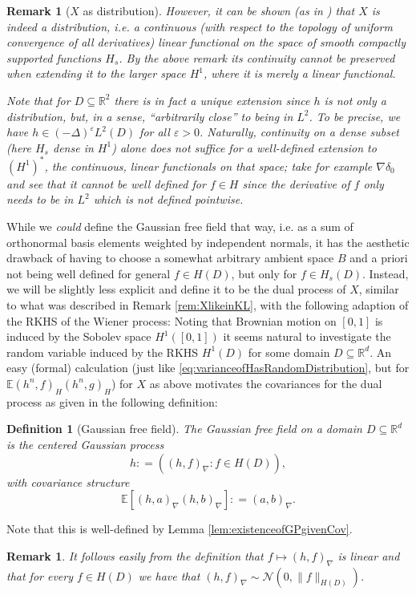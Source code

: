 \documentclass[11pt,reqno]{amsart}
\numberwithin{equation}{section}
\newtheorem{defi}[thm]{Definition}
\newtheorem{rem}[thm]{Remark}
\newcommand{\deq}{\mathrel{\mathop:}=}
\newcommand{\eps}{\varepsilon}
\begin{document}
\begin{rem}[$X$ as distribution]	\label{rem:spaceofX}
	However, it can be shown (as in \cite{She07}) that $X$ is indeed a distribution, i.e. a continuous (with respect to the topology of uniform convergence of all derivatives) linear functional on the space of smooth compactly supported functions $H_s$. By the above remark its continuity cannot be preserved when extending it to the larger space $H^1$, where it is merely a linear functional.
	
	Note that for $D\subseteq\mathbb R^2$ there is in fact a unique extension since $h$ is not only a distribution, but, in a sense, ``arbitrarily close'' to being in $L^2$. To be precise, we have $h\in (-\Delta)^\eps L^2(D)$ for all $\eps>0$. Naturally, continuity on a dense subset (here $H_s$ dense in $H^1$) alone does not suffice for a well-defined extension to $(H^1)^*$, the \emph{continuous}, linear functionals on that space; take for example $\nabla\delta_0$ and see that it cannot be well defined for $f\in H$ since the derivative of $f$ only needs to be in $L^2$ which is not defined pointwise.
\end{rem}

While we \emph{could} define the Gaussian free field that way, i.e. as a sum of orthonormal basis elements weighted by independent normals, it has the aesthetic drawback of having to choose a somewhat arbitrary ambient space $B$ and a priori not being well defined for general $f\in H(D)$, but only for $f\in H_s(D)$. Instead, we will be slightly less explicit and define it to be the dual process of $X$, similar to what was described in Remark \ref{rem:XlikeinKL}, with the following adaption of the RKHS of the Wiener process: Noting that Brownian motion on $[0,1]$ is induced by the Sobolev space $H^1([0,1])$ it seems natural to investigate the random variable induced by the RKHS $H^1(D)$ for some domain $D\subseteq\mathbb R^d$. An easy (formal) calculation (just like \eqref{eq:varianceofHasRandomDistribution}, but for $\mathbb E(h^n,f)_H(h^n,g)_H$) for $X$ as above motivates the covariances for the dual process as given in the following definition:

\begin{defi}[Gaussian free field]\label{def:GFF}
	The Gaussian free field on a domain $D\subseteq\mathbb R^d$ is the centered Gaussian process $$h\deq ((h,f)_\nabla : f\in H(D)),$$ with covariance structure $$\mathbb E[(h,a)_\nabla(h,b)_\nabla]\deq (a,b)_\nabla.$$
\end{defi}
Note that this is well-defined by Lemma \ref{lem:existenceofGPgivenCov}.
\begin{rem}
	It follows easily from the definition that $f\mapsto (h,f)_\nabla$ is linear and that for every $f\in H(D)$ we have that $(h,f)_\nabla\sim\mathcal N(0,\|f\|_{H(D)})$.
\end{rem}
\end{document}
